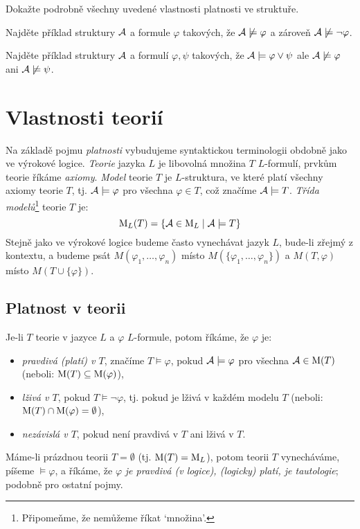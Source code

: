 \begin{exercise}
    Dokažte podrobně všechny uvedené vlastnosti platnosti ve struktuře.
\end{exercise}

\begin{exercise}
    Najděte příklad struktury $\mathcal{A}$ a formule $\varphi$ takových, že $\mathcal{A}\not\models\varphi$ a zároveň $\mathcal{A}\not\models\neg\varphi$.
\end{exercise}

\begin{exercise}
    Najděte příklad struktury $\mathcal{A}$ a formulí $\varphi,\psi$ takových, že $\mathcal{A}\models\varphi\lor\psi$ ale $\mathcal{A}\not\models\varphi$ ani $\mathcal{A}\not\models\psi$.
\end{exercise}

\section{Vlastnosti teorií}

Na základě pojmu \emph{platnosti} vybudujeme syntaktickou terminologii obdobně jako ve výrokové logice. \emph{Teorie} jazyka $L$ je libovolná množina $T$ $L$-formulí, prvkům teorie říkáme \emph{axiomy}. \emph{Model} teorie $T$ je $L$-struktura, ve které platí všechny axiomy teorie $T$, tj. $\mathcal{A}\models\varphi$ pro všechna $\varphi\in T$, což značíme $\mathcal{A}\models T$. \emph{Třída modelů}\footnote{Připomeňme, že nemůžeme říkat `množina'.} teorie $T$ je:
$$
\operatorname{M}_L(T)=\{\mathcal{A}\in\operatorname{M}_L\mid\mathcal{A}\models T\}
$$
Stejně jako ve výrokové logice budeme často vynechávat jazyk $L$, bude-li zřejmý z kontextu, a budeme psát $M(\varphi_1,\dots,\varphi_n)$ místo $M(\{\varphi_1,\dots,\varphi_n\})$ a $M(T,\varphi)$ místo $M(T\cup\{\varphi\})$.

\subsection{Platnost v teorii}

Je-li $T$ teorie v jazyce $L$ a $\varphi$ $L$-formule, potom říkáme, že $\varphi$ je: 
\begin{itemize}
    \item \emph{pravdivá (platí) v $T$}, značíme $T\models\varphi$, pokud $\mathcal{A}\models\varphi$ pro všechna $\mathcal{A}\in\operatorname{M}(T)$ (neboli: $\operatorname{M}(T)\subseteq\operatorname{M}(\varphi)$),
    \item \emph{lživá v $T$}, pokud $T\models\neg\varphi$, tj. pokud je lživá v každém modelu $T$ (neboli: $\operatorname{M}(T)\cap\operatorname{M}(\varphi)=\emptyset$),
    \item \emph{nezávislá v $T$}, pokud není pravdivá v $T$ ani lživá v $T$.
\end{itemize}
Máme-li prázdnou teorii $T=\emptyset$ (tj. $\operatorname{M}(T)=\operatorname{M}_L$), potom teorii $T$ vynecháváme, píšeme $\models\varphi$, a říkáme, že $\varphi$ \emph{je pravdivá (v logice), (logicky) platí, je tautologie}; podobně pro ostatní pojmy.

